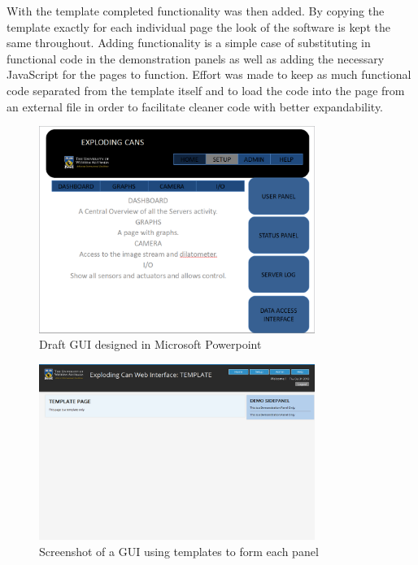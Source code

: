 	With the template completed functionality was then added.  By copying the template exactly for each individual page the look of the software is kept the same throughout.  Adding functionality is a simple case of substituting in functional code in the demonstration panels as well as adding the necessary JavaScript for the pages to function.  Effort was made to keep as much functional code separated from the template itself and to load the code into the page from an external file in order to facilitate cleaner code with better expandability.

\begin{figure}[H]
	\centering
	\includegraphics[width=0.8\textwidth]{figures/draftGUI.png}
	\caption{Draft GUI designed in Microsoft Powerpoint} 
	\label{draftGUI.png}
\end{figure}

\begin{figure}[H]
	\centering
	\includegraphics[width=0.8\textwidth]{figures/templateGUI.png}
	\caption{Screenshot of a GUI using templates to form each panel} 
	\label{templateGUI.png}
\end{figure}

